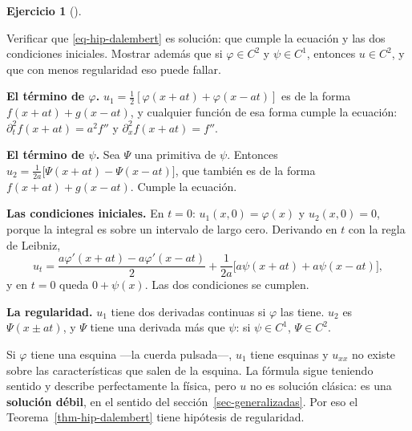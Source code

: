 \documentclass[
  spanish,
  a4paper,
]{scrbook}
\theoremstyle{definition}
\theoremstyle{plain}
\theoremstyle{definition}
\theoremstyle{plain}
\theoremstyle{definition}
\newtheorem{exercise}{Ejercicio}[chapter]
\theoremstyle{remark}
\begin{document}
\begin{exercise}[]\protect\hypertarget{exr-hip-verificar}{}\label{exr-hip-verificar}

Verificar que \ref{eq-hip-dalembert} es solución: que cumple la ecuación
y las dos condiciones iniciales. Mostrar además que si
\(\varphi\in C^2\) y \(\psi\in C^1\), entonces \(u\in C^2\), y que con
menos regularidad eso puede fallar.

\end{exercise}

\begin{tcolorbox}[enhanced jigsaw, arc=.35mm, bottomrule=.15mm, bottomtitle=1mm, breakable, colback=white, colbacktitle=quarto-callout-tip-color!10!white, colframe=quarto-callout-tip-color-frame, coltitle=black, left=2mm, leftrule=.75mm, opacityback=0, opacitybacktitle=0.6, rightrule=.15mm, title=\textcolor{quarto-callout-tip-color}{\faLightbulb}\hspace{0.5em}{Solución}, titlerule=0mm, toprule=.15mm, toptitle=1mm]

\textbf{El término de \(\varphi\).}
\(u_1 = \tfrac12[\varphi(x+at)+\varphi(x-at)]\) es de la forma
\(f(x+at)+g(x-at)\), y cualquier función de esa forma cumple la
ecuación: \(\partial_t^2 f(x+at) = a^2f''\) y
\(\partial_x^2 f(x+at) = f''\).

\textbf{El término de \(\psi\).} Sea \(\Psi\) una primitiva de \(\psi\).
Entonces \(u_2 = \tfrac{1}{2a}\big[\Psi(x+at) - \Psi(x-at)\big]\), que
también es de la forma \(f(x+at)+g(x-at)\). Cumple la ecuación.

\textbf{Las condiciones iniciales.} En \(t=0\):
\(u_1(x,0) = \varphi(x)\) y \(u_2(x,0) = 0\), porque la integral es
sobre un intervalo de largo cero. Derivando en \(t\) con la regla de
Leibniz, \[
u_t = \frac{a\varphi'(x+at) - a\varphi'(x-at)}{2} + \frac{1}{2a}\big[a\psi(x+at) + a\psi(x-at)\big],
\] y en \(t=0\) queda \(0 + \psi(x)\). Las dos condiciones se cumplen.

\textbf{La regularidad.} \(u_1\) tiene dos derivadas continuas si
\(\varphi\) las tiene. \(u_2\) es \(\Psi(x\pm at)\), y \(\Psi\) tiene
una derivada más que \(\psi\): si \(\psi\in C^1\), \(\Psi\in C^2\).

Si \(\varphi\) tiene una esquina ---la cuerda pulsada---, \(u_1\) tiene
esquinas y \(u_{xx}\) no existe sobre las características que salen de
la esquina. La fórmula sigue teniendo sentido y describe perfectamente
la física, pero \(u\) no es solución clásica: es una \textbf{solución
débil}, en el sentido del sección~\ref{sec-generalizadas}. Por eso el
Teorema~\ref{thm-hip-dalembert} tiene hipótesis de regularidad.

\end{tcolorbox}
\end{document}
